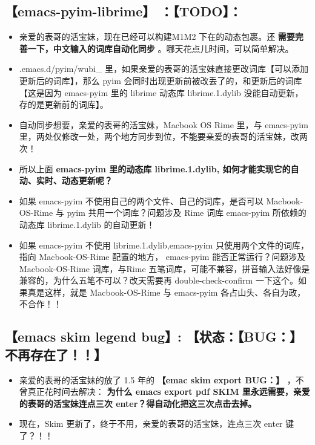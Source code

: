 \documentclass[9pt, b5paper]{article}
\begin{document}
\subsection{\textbf{【emacs-pyim-librime】} ：【TODO】：}
\label{sec-1-9}
\begin{itemize}
\item 亲爱的表哥的活宝妹，现在已经可以构建M1M2 下在的动态包裹。还 \textbf{需要完善一下，中文输入的词库自动化同步} 。哪天花点儿时间，可以简单解决。
\item .emacs.d/pyim/wubi\_ 里，如果亲爱的表哥的活宝妹直接更改词库【可以添加更新后的词库】，那么 pyim 会同时出现更新前被改丢了的，和更新后的词库【这是因为 emacs-pyim 里的 librime 动态库 librime.1.dylib 没能自动更新，存的是更新前的词库】。
\item 自动同步想要，亲爱的表哥的活宝妹，Macbook OS Rime 里，与 emacs-pyim 里，两处仅修改一处，两个地方同步到位，不能要亲爱的表哥的活宝妹，改两次！
\item 所以上面 \textbf{emacs-pyim 里的动态库 librime.1.dylib, 如何才能实现它的自动、实时、动态更新呢？}
\item 如果 emacs-pyim 不使用自己的两个文件、自己的词库，是否可以 Macbook-OS-Rime 与 pyim 共用一个词库？问题涉及 Rime 词库 emacs-pyim 所依赖的动态库 librime.1.dylib 的自动更新！
\item 如果 emacs-pyim 不使用 librime.1.dylib,emacs-pyim 只使用两个文件的词库，指向 Macbook-OS-Rime 配置的地方， emacs-pyim 能否正常运行？问题涉及Macbook-OS-Rime 词库，与Rime 五笔词库，可能不兼容，拼音输入法好像是兼容的，为什么五笔不可以？改天需要再 double-check-confirm 一下这个。如果真是这样，就是 Macbook-OS-Rime 与 emacs-pyim 各占山头、各自为政，不合作！！
\end{itemize}
\subsection{\textbf{【emacs skim legend bug】}: 【状态：【BUG：】不再存在了！！】}
\label{sec-1-10}
\begin{itemize}
\item 亲爱的表哥的活宝妹的放了 1.5 年的 \textbf{【emac skim export BUG：】} ，不曾真正花时间去解决： \textbf{为什么 emacs export pdf SKIM 里永远需要，亲爱的表哥的活宝妹连点三次 enter？得自动化把这三次点击去掉。}
\item 现在，Skim 更新了，终于不用，亲爱的表哥的活宝妹，连点三次 enter 键了？！！
\end{itemize}
\end{document}
